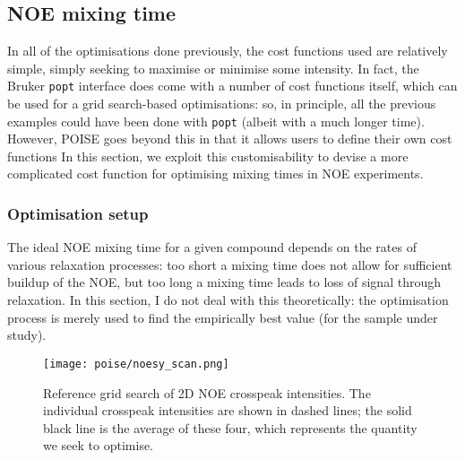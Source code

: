 \subsection{NOE mixing time}
\label{subsec:poise__noe}

In all of the optimisations done previously, the cost functions used are relatively simple, simply seeking to maximise or minimise some intensity.
In fact, the Bruker \texttt{popt} interface does come with a number of cost functions itself, which can be used for a grid search-based optimisations: so, in principle, all the previous examples could have been done with \texttt{popt} (albeit with a much longer time).
However, POISE goes beyond this in that it allows users to define their own cost functions
In this section, we exploit this customisability to devise a more complicated cost function for optimising mixing times in NOE experiments.

\subsubsection{Optimisation setup}

The ideal NOE mixing time for a given compound depends on the rates of various relaxation processes: too short a mixing time does not allow for sufficient buildup of the NOE, but too long a mixing time leads to loss of signal through relaxation.
In this section, I do not deal with this theoretically: the optimisation process is merely used to find the empirically best value (for the sample under study).

\begin{figure}[htb]
    \centering
    \texttt{[image: poise/noesy\_scan.png]}%
    \caption[Reference grid search of 2D NOE crosspeak intensities]{
        Reference grid search of 2D NOE crosspeak intensities.
        The individual crosspeak intensities are shown in dashed lines; the solid black line is the average of these four, which represents the quantity we seek to optimise.
    }
    \label{fig:poise_noesy_scan}
\end{figure}

